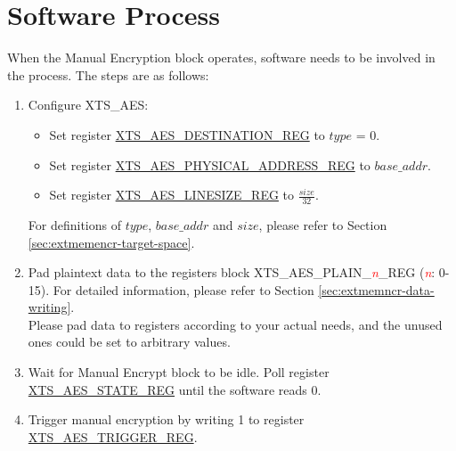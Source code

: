 \documentclass[main\_\_EN.tex]{subfiles}
\begin{document}
\section{ Software Process }

When the Manual Encryption block operates, software needs to be involved in the process. The steps are as follows:

\begin{enumerate}

    \item Configure XTS\_AES:
    \begin{itemize}
        \item Set register \hyperref[regdesc:XTSAESDESTINATIONREG]{XTS\_AES\_DESTINATION\_REG} to \begin{math}type\end{math} = 0.
        \item Set register \hyperref[regdesc:XTSAESPHYSICALADDRESSREG]{XTS\_AES\_PHYSICAL\_ADDRESS\_REG} to \begin{math}base\_addr\end{math}.
        \item Set register \hyperref[regdesc:XTSAESLINESIZEREG]{XTS\_AES\_LINESIZE\_REG} to \begin{math}\frac{size}{32}\end{math}.
    \end{itemize}
    For definitions of \begin{math} type \end{math}, \begin{math} base\_addr\end{math} and \begin{math}size\end{math}, please refer to Section \ref{sec:extmemencr-target-space}.
    \item Pad plaintext data to the registers block XTS\_AES\_PLAIN\_\textcolor{red}{\it{n}}\_REG (\textcolor{red}{\it{n}}: 0-15). For detailed information, please refer to Section \ref{sec:extmemncr-data-writing}. \\Please pad data to registers according to your actual needs, and the unused ones could be set to arbitrary values.

    \item Wait for Manual Encrypt block to be idle. Poll register \hyperref[regdesc:XTSAESSTATEREG]{XTS\_AES\_STATE\_REG} until the software reads 0.

    \item Trigger manual encryption by writing 1 to register \hyperref[regdesc:XTSAESTRIGGERREG]{XTS\_AES\_TRIGGER\_REG}.


\end{enumerate}
\end{document}
